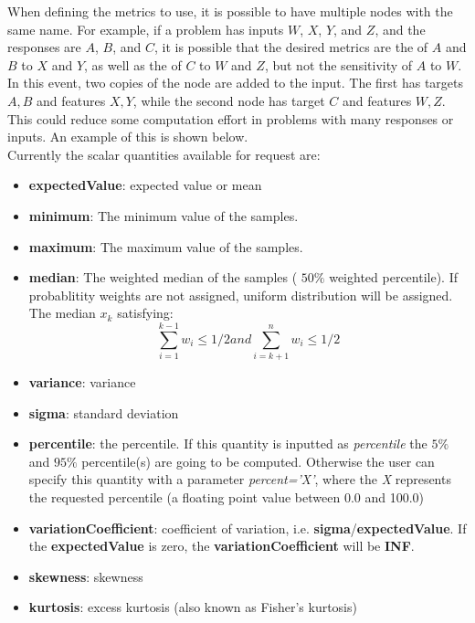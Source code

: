 \begin{itemize}
    \nb When defining the metrics to use, it is possible to have multiple nodes with the same name.  For
    example, if a problem has inputs $W$, $X$, $Y$, and $Z$, and the responses are $A$, $B$, and $C$, it is possible that
    the desired metrics are the  of $A$ and $B$ to $X$ and $Y$, as well as the
     of $C$ to $W$ and $Z$, but not the sensitivity of $A$ to $W$.   In this event, two
    copies of the  node are added to the input.  The first has targets $A,B$ and features
    $X,Y$, while the second node has target $C$ and features $W,Z$.  This could reduce some computation effort
    in problems with many responses or inputs.  An example of this is shown below.
  \\ Currently the scalar quantities available for request are:
  \begin{itemize}
    \item \textbf{expectedValue}: expected value or mean
    \item \textbf{minimum}: The minimum value of the samples.
    \item \textbf{maximum}: The maximum value of the samples.
    \item \textbf{median}:  The weighted median of the samples ( $50\%$ weighted percentile). If probablitity weights are not assigned, uniform distribution will be assigned. The median $x_k$ satisfying:
    \begin{equation}
      \sum_{i = 1}^{k - 1} w_i \le 1/2  and \sum_{i = k + 1}^{n} w_i \le 1/2
    \end{equation}
    \item \textbf{variance}: variance
    \item \textbf{sigma}: standard deviation
    \item \textbf{percentile}: the percentile. If this quantity is inputted as \textit{percentile} the $5\%$ and $95\%$ percentile(s) are going to be computed.
                               Otherwise the user can specify this quantity with a parameter \textit{percent='X'}, where the \textit{X} represents the requested
                               percentile (a floating point value between 0.0 and 100.0)
    \item \textbf{variationCoefficient}: coefficient of variation, i.e. \textbf{sigma}/\textbf{expectedValue}. \nb If the \textbf{expectedValue} is zero,
    the \textbf{variationCoefficient} will be \textbf{INF}.
    \item \textbf{skewness}: skewness
    \item \textbf{kurtosis}: excess kurtosis (also known as Fisher's kurtosis)

\end{itemize}
\end{itemize}
